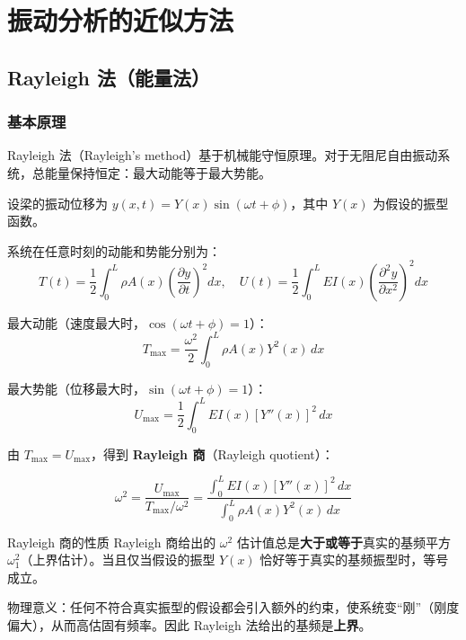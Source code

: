 
\chapter{振动分析的近似方法}


\section{Rayleigh 法（能量法）}

\subsection{基本原理}

Rayleigh 法（Rayleigh's method）基于机械能守恒原理。对于无阻尼自由振动系统，总能量保持恒定：最大动能等于最大势能。

设梁的振动位移为 $y(x,t) = Y(x)\sin(\omega t + \phi)$，其中 $Y(x)$ 为假设的振型函数。

系统在任意时刻的动能和势能分别为：
\[
T(t) = \frac{1}{2}\int_0^L \rho A(x)\left(\frac{\partial y}{\partial t}\right)^2 dx, \quad
U(t) = \frac{1}{2}\int_0^L EI(x)\left(\frac{\partial^2 y}{\partial x^2}\right)^2 dx
\]

最大动能（速度最大时，$\cos(\omega t+\phi)=1$）：
\[
T_{\max} = \frac{\omega^2}{2}\int_0^L \rho A(x)Y^2(x)\,dx
\]

最大势能（位移最大时，$\sin(\omega t+\phi)=1$）：
\[
U_{\max} = \frac{1}{2}\int_0^L EI(x)[Y''(x)]^2\,dx
\]

由 $T_{\max}=U_{\max}$，得到 \textbf{Rayleigh 商}（Rayleigh quotient）：

\begin{myformula}
\[
\omega^2 = \frac{U_{\max}}{T_{\max}/\omega^2} = \frac{\int_0^L EI(x)[Y''(x)]^2\,dx}{\int_0^L \rho A(x)Y^2(x)\,dx}
\]
\end{myformula}

\begin{mydefinition}{Rayleigh 商的性质}
Rayleigh 商给出的 $\omega^2$ 估计值总是\textbf{大于或等于}真实的基频平方 $\omega_1^2$（上界估计）。当且仅当假设的振型 $Y(x)$ 恰好等于真实的基频振型时，等号成立。
\end{mydefinition}

物理意义：任何不符合真实振型的假设都会引入额外的约束，使系统变``刚''（刚度偏大），从而高估固有频率。因此 Rayleigh 法给出的基频是\textbf{上界}。

